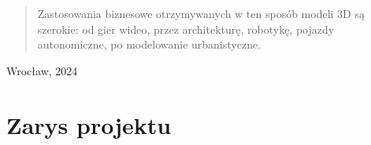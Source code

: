 \begin{titlepage}
\begin{center}
\begin{abstract}
            Zastosowania biznesowe otrzymywanych w ten sposób modeli 3D są szerokie: od gier wideo, przez architekturę, robotykę, pojazdy autonomiczne, po modelowanie urbanistyczne.
        \end{abstract}

        \vfill
            
            
        \vspace{0.8cm}
            
            
        \Large
        Wrocław, 2024
        
            
    \end{center}
\end{titlepage}

\section{Zarys projektu}